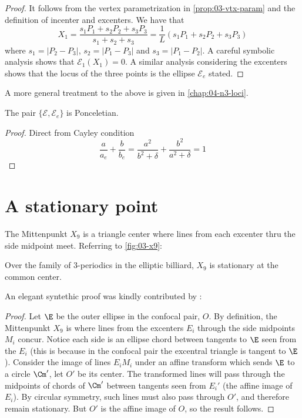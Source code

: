 \begin{proof}
It follows from the vertex parametrization in \cref{prop:03-vtx-param} and the definition of incenter and excenters.  
We have that
\[X_1=\frac{s_1 P_1+s_2P_2+s_3P_3}{s_1+s_2+s_3}=
\frac{1}{L}(s_1P_1+s_2P_2+s_3P_3)\]
where $s_1=|P_2-P_3|$, $s_2=|P_1-P_3|$ and $s_3=|P_1-P_2|$.
A careful symbolic analysis shows that $\mathcal{E}_1(X_1)=0$. A similar analysis considering the excenters shows that the locus of the three points is the ellipse $\mathcal{E}_e$ stated.
\end{proof}

\noindent A more general treatment to the above is given in \cref{chap:04-n3-loci}.

\begin{corollary}
The pair $\{\mathcal{E},\mathcal{E}_e\}$ is Ponceletian.
\label{cor:03-excentral-billiard-poncelet}
\end{corollary}

\begin{proof}
Direct from Cayley condition
\[\frac{a}{a_e}+\frac{b}{b_e}=\frac{a^2}{b^2+\delta}+\frac{b^2}{a^2+\delta}= 1\]

\end{proof}

\section{A stationary point}
\label{sec:03-stationary}

The Mittenpunkt $X_9$ is a triangle center where lines from each excenter thru the side midpoint meet. Referring to \cref{fig:03-x9}:
\begin{theorem}
Over the family of 3-periodics in the elliptic billiard, $X_9$ is stationary at the common center.
\end{theorem}

An elegant syntethic proof was kindly contributed by \cite{olga19_mitten}:

\begin{proof}
Let $\E$ be the outer ellipse in the confocal pair, $O$. By definition, the Mittenpunkt $X_9$ is where lines from the excenters $E_i$ through the side midpoints $M_i$ concur. Notice each side is an ellipse chord between tangents to $\E$ seen from the $E_i$ (this is because in the confocal pair the excentral triangle is tangent to $\E$). Consider the image of lines $E_i M_i$ under an affine transform which sends $\E$ to a circle $\Cm'$, let $O'$ be its center. The transformed lines will pass through the midpoints of chords of $\Cm'$ between tangents seen from $E_i'$ (the affine image of $E_i$). By circular symmetry, such lines must also pass through $O'$, and therefore remain stationary. But $O'$ is the affine image of $O$, so the result follows.
\end{proof}

